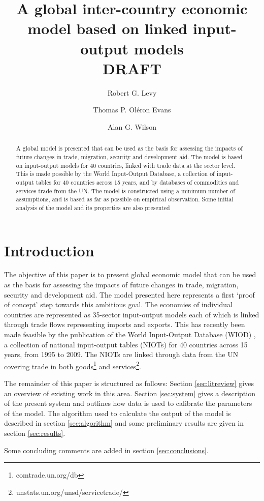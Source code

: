 \documentclass[a4paper]{article}
\title{A global inter-country economic model based on linked input-output models \\ DRAFT}
\author[*]{Robert G. Levy}
\author[**]{Thomas P. Ol\'{e}ron Evans}
\author[*]{Alan G. Wilson}
\affil[*]{Centre for Advanced Spatial Analysis, UCL Bartlett Faculty of the Built Environment,
90 Tottenham Court Road, London W1T 4TJ, UK}
\affil[**]{Department of Mathematics, University College London, Gower Street, London WC1E 6BT, UK}
\begin{document}
\maketitle

\begin{abstract}
A global model is presented that can be used as the basis for assessing the impacts of future changes in trade, migration, security and development aid.
The model is based on input-output models for 40 countries, linked with trade data at the sector level.
This is made possible by the World Input-Output Database, a collection of input-output tables for 40 countries across 15 years, and by databases of commodities and services trade from the UN.
The model is constructed using a minimum number of assumptions, and is based as far as possible on empirical observation.
Some initial analysis of the model and its properties are also presented
\end{abstract}

\section{Introduction}
The objective of this paper is to present global economic model that can be used as the basis for assessing the impacts of future changes in trade, migration, security and development aid.
The model presented here represents a first `proof of concept' step towards this ambitious goal.
The economies of individual countries are represented as 35-sector input-output models each of which is linked through trade flows representing imports and exports.
This has recently been made feasible by the publication of the World Input-Output Database (WIOD) \parencite{Timmer2012}, a collection of national input-output tables (NIOTs) for 40 countries across 15 years, from 1995 to 2009.
The NIOTs are linked through data from the UN covering trade in both goods\footnote{comtrade.un.org/db} and services\footnote{unstats.un.org/unsd/servicetrade/}.

The remainder of this paper is structured as follows: 
Section \ref{sec:litreview} gives an overview of existing work in this area.
Section \ref{sec:system} gives a description of the present system and outlines how data is used to calibrate the parameters of the model.
The algorithm used to calculate the output of the model is described in section \ref{sec:algorithm} and some preliminary results are given in section \ref{sec:results}.

Some concluding comments are added in section \ref{sec:conclusions}.
\end{document}
